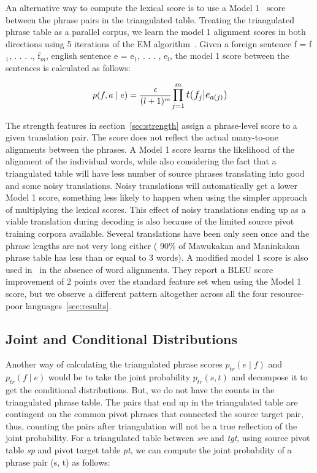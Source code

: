         An alternative way to compute the lexical score is to use a Model 1~\cite{Brown:1993} score between the phrase pairs in the triangulated table. Treating the triangulated phrase table as a parallel corpus, we learn the model 1 alignment scores in both directions using 5 iterations of the EM algorithm~\cite{Dempster:77}. Given a foreign sentence f = f$_{1}$, . . . ., f$_{m}$, english sentence e = e$_{1}$, . . . , e$_{l}$, the model 1 score between the sentences is calculated as follows:

                \begin{equation}
                        p(f, a \mid e) = \frac{\epsilon}{(l+1)^m}\mathlarger{\prod\limits_{j=1}^{m}t(f_{j}|e_{a(j)})}
                \end{equation}

        The strength features in section~\ref{sec:strength} assign a phrase-level score to a given translation pair. The score does not reflect the actual many-to-one alignments between the phrases. A Model 1 score learns the likelihood of the alignment of the individual words, while also considering the fact that a triangulated table will have less number of source phrases translating into good and some noisy translations. Noisy translations will automatically get a lower Model 1 score, something less likely to happen when using the simpler approach of multiplying the lexical scores. This effect of noisy translations ending up as a viable translation during decoding is also because of the limited source pivot training corpora available. Several translations have been only seen once and the phrase lengths are not very long either ( 90\% of Mawukakan and Maninkakan phrase table has less than or equal to 3 words). A modified model 1 score is also used in~\cite{Cohn:07} in the absence of word alignments. They report a BLEU score improvement of 2 points over the standard feature set when using the Model 1 score, but we observe a different pattern altogether across all the four resource-poor languages~\ref{sec:results}.

\subsection{Joint and Conditional Distributions}
\label{subsec:joint}

Another way of calculating the triangulated phrase scores $p_{tr}(e \mid f)$ and $p_{tr}(f \mid e)$ would be to take the joint probability $p_{tr}(s, t)$ and decompose it to get the conditional distributions. But, we do not have the counts in the triangulated phrase table. The pairs that end up in the triangulated table are contingent on the common pivot phrases that connected the source target pair, thus, counting the pairs after triangulation will not be a true reflection of the joint probability. For a triangulated table between \emph{src} and \emph{tgt}, using source pivot table \emph{sp} and pivot target table \emph{pt}, we can compute the joint probability of a phrase pair (s, t) as follows:

